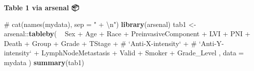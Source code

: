\documentclass[
]{article}
\newenvironment{Shaded}{\begin{snugshade}}{\end{snugshade}}
\newcommand{\CommentTok}[1]{\textcolor[rgb]{0.54,0.53,0.53}{#1}}
\newcommand{\DataTypeTok}[1]{\textcolor[rgb]{0.00,0.34,0.68}{#1}}
\newcommand{\KeywordTok}[1]{\textcolor[rgb]{0.12,0.11,0.11}{\textbf{#1}}}
\newcommand{\NormalTok}[1]{\textcolor[rgb]{0.12,0.11,0.11}{#1}}
\newcommand{\OperatorTok}[1]{\textcolor[rgb]{0.12,0.11,0.11}{#1}}
\newcommand{\StringTok}[1]{\textcolor[rgb]{0.75,0.01,0.01}{#1}}
\begin{document}
\textbf{Table 1 via arsenal 📦}

\begin{Shaded}
\begin{Highlighting}[]
\CommentTok{# cat(names(mydata), sep = " + \textbackslash{}n")}
\KeywordTok{library}\NormalTok{(arsenal)}
\NormalTok{tab1 <-}\StringTok{ }\NormalTok{arsenal}\OperatorTok{::}\KeywordTok{tableby}\NormalTok{(}
  \OperatorTok{~}\StringTok{ }\NormalTok{Sex }\OperatorTok{+}
\StringTok{    }\NormalTok{Age }\OperatorTok{+}
\StringTok{    }\NormalTok{Race }\OperatorTok{+}
\StringTok{    }\NormalTok{PreinvasiveComponent }\OperatorTok{+}
\StringTok{    }\NormalTok{LVI }\OperatorTok{+}
\StringTok{    }\NormalTok{PNI }\OperatorTok{+}
\StringTok{    }\NormalTok{Death }\OperatorTok{+}
\StringTok{    }\NormalTok{Group }\OperatorTok{+}
\StringTok{    }\NormalTok{Grade }\OperatorTok{+}
\StringTok{    }\NormalTok{TStage }\OperatorTok{+}
\StringTok{    }\CommentTok{# `Anti-X-intensity` +}
\StringTok{    }\CommentTok{# `Anti-Y-intensity` +}
\StringTok{    }\NormalTok{LymphNodeMetastasis }\OperatorTok{+}
\StringTok{    }\NormalTok{Valid }\OperatorTok{+}
\StringTok{    }\NormalTok{Smoker }\OperatorTok{+}
\StringTok{    }\NormalTok{Grade_Level}
\NormalTok{  ,}
  \DataTypeTok{data =}\NormalTok{ mydata }
\NormalTok{)}
\KeywordTok{summary}\NormalTok{(tab1)}
\end{Highlighting}
\end{Shaded}
\end{document}

